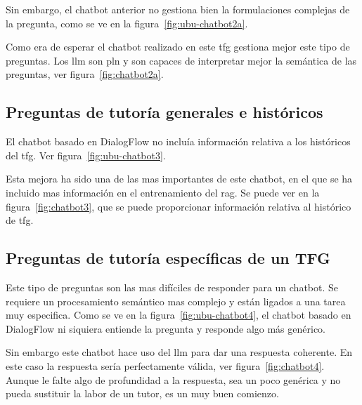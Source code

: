 
Sin embargo, el chatbot anterior no gestiona bien la formulaciones complejas de la pregunta, como se ve en la figura~\ref{fig:ubu-chatbot2a}.


Como era de esperar el chatbot realizado en este \acrshort{tfg} gestiona mejor este tipo de preguntas. Los \acrshort{llm} son \acrlong{pln} y son capaces de interpretar mejor la semántica de las preguntas, ver figura~\ref{fig:chatbot2a}.


\subsection{Preguntas de tutoría generales e históricos}

El chatbot basado en DialogFlow no incluía información relativa a los históricos del \acrshort{tfg}. Ver figura~\ref{fig:ubu-chatbot3}.


Esta mejora ha sido una de las mas importantes de este chatbot, en el que se ha incluido mas información en el entrenamiento del \acrshort{rag}. Se puede ver en la figura~\ref{fig:chatbot3}, que se puede proporcionar información relativa al histórico de \acrshort{tfg}.


\subsection{Preguntas de tutoría específicas de un TFG}

Este tipo de preguntas son las mas difíciles de responder para un chatbot. Se requiere un procesamiento semántico mas complejo y están ligados a una tarea muy especifica. Como se ve en la figura~\ref{fig:ubu-chatbot4}, el chatbot basado en DialogFlow ni siquiera entiende la pregunta y responde algo más genérico.


Sin embargo este chatbot hace uso del \acrshort{llm} para dar una respuesta coherente. En este caso la respuesta sería perfectamente válida, ver figura~\ref{fig:chatbot4}. Aunque le falte algo de profundidad a la respuesta, sea un poco genérica y no pueda sustituir la labor de un tutor, es un muy buen comienzo.


